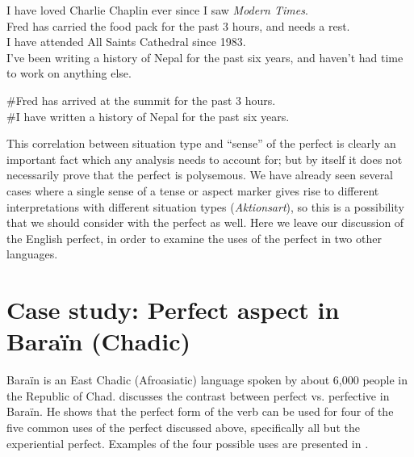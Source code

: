 \ea
\ea I have loved Charlie Chaplin ever since I saw \textit{Modern Times}.\\
\ex Fred has carried the food pack for the past 3 hours, and needs a rest.\\
\ex I have attended All Saints Cathedral since 1983.\\
\ex I’ve been writing a history of Nepal for the past six years, and haven’t had time\\
  to work on anything else.
                       \z
\z

\ea
\ea \#Fred has arrived at the summit for the past 3 hours.\\
\ex \#I have written a history of Nepal for the past six years.
                       \z
\z


This correlation between situation type and “sense” of the perfect is clearly an important fact which any analysis needs to account for; but by itself it does not necessarily prove that the perfect is polysemous. We have already seen several cases where a single sense of a tense or aspect marker gives rise to different interpretations with different situation types (\textit{Aktionsart}), so this is a possibility that we should consider with the perfect as well. Here we leave our discussion of the English perfect, in order to examine the uses of the perfect in two other languages.


\section{Case study: Perfect aspect in Baraïn (Chadic)}\label{sec:22.5}

Baraïn is an East Chadic (Afroasiatic) language spoken by about 6,000 people in the Republic of Chad. \citet{Lovestrand2012} discusses the contrast between perfect vs. perfective in Baraïn. He shows that the perfect form of the verb can be used for four of the five common uses of the perfect discussed above, specifically all but the experiential perfect. Examples of the four possible uses are presented in .


